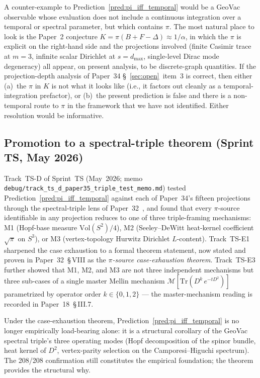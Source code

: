 \documentclass[11pt]{article}
\begin{document}
A counter-example to Prediction~\ref{pred:pi_iff_temporal} would be a
GeoVac observable whose evaluation does not include a continuous
integration over a temporal or spectral parameter, but which contains
$\pi$.  The most natural place to look is the Paper~2 conjecture
$K = \pi(B + F - \Delta) \approx 1/\alpha$, in which the $\pi$ is
explicit on the right-hand side and the projections involved (finite
Casimir trace at $m=3$, infinite scalar Dirichlet at $s = d_\text{max}$,
single-level Dirac mode degeneracy) all appear, on present analysis,
to be discrete-graph quantities.  If the projection-depth analysis of
Paper~34 \S~\ref{sec:open}~item~3 is correct, then either (a)~the
$\pi$ in $K$ is not what it looks like (i.e., it factors out cleanly
as a temporal-integration prefactor), or (b)~the present prediction is
false and there is a non-temporal route to $\pi$ in the framework that
we have not identified.  Either resolution would be informative.

\subsection{Promotion to a spectral-triple theorem (Sprint TS, May 2026)}
\label{sec:tsd_promotion}

Track~TS-D of Sprint~TS (May~2026; memo
\texttt{debug/track\_ts\_d\_paper35\_triple\_test\_memo.md}) tested
Prediction~\ref{pred:pi_iff_temporal} against each of Paper~34's
fifteen projections through the spectral-triple lens of
Paper~32~\cite{paper32}, and found that every $\pi$-source identifiable
in any projection reduces to one of three triple-framing mechanisms:
M1 (Hopf-base measure $\mathrm{Vol}(S^2)/4$), M2 (Seeley--DeWitt
heat-kernel coefficient $\sqrt{\pi}$ on $S^3$), or M3 (vertex-topology
Hurwitz Dirichlet $L$-content).  Track~TS-E1 sharpened the case
exhaustion to a formal theorem statement, now stated and proven in
Paper~32~\S\,VIII as the \emph{$\pi$-source case-exhaustion theorem}.
Track~TS-E3 further showed that M1, M2, and M3 are not three
independent mechanisms but three sub-cases of a single master Mellin
mechanism $\mathcal{M}[\mathrm{Tr}(D^k\,e^{-tD^2})]$ parametrized by
operator order $k \in \{0, 1, 2\}$ — the master-mechanism reading is
recorded in Paper~18~\S\,III.7.

Under the case-exhaustion theorem,
Prediction~\ref{pred:pi_iff_temporal} is no longer empirically
load-bearing alone: it is a structural corollary of the GeoVac
spectral triple's three operating modes (Hopf decomposition of the
spinor bundle, heat kernel of $D^2$, vertex-parity selection on the
Camporesi--Higuchi spectrum).  The 208/208 confirmation still
constitutes the empirical foundation; the theorem provides the
structural why.
\end{document}
